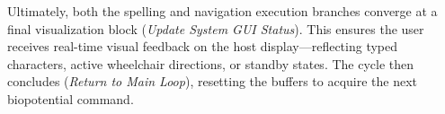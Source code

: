 Ultimately, both the spelling and navigation execution branches converge at a final visualization block (\textit{Update System GUI Status}). This ensures the user receives real-time visual feedback on the host display---reflecting typed characters, active wheelchair directions, or standby states. The cycle then concludes (\textit{Return to Main Loop}), resetting the buffers to acquire the next biopotential command.

